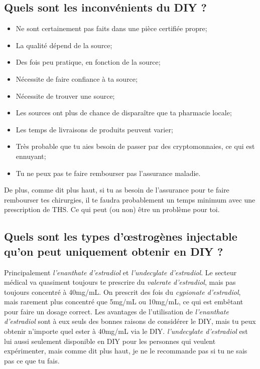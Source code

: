 \documentclass{article}
\begin{document}
\subsection{Quels sont les inconvénients du DIY ?}

\begin{itemize}
  \item Ne sont certainement pas faits dans une pièce certifiée propre;
  \item La qualité dépend de la source;
  \item Des fois peu pratique, en fonction de la source;
  \item Nécessite de faire confiance à ta source;
  \item Nécessite de trouver une source;
  \item Les sources ont plus de chance de disparaître que ta pharmacie locale;
  \item Les temps de livraisons de produits peuvent varier;
  \item Très probable que tu aies besoin de passer par des cryptomonnaies, ce qui est ennuyant;
  \item Tu ne peux pas te faire rembourser pas l'assurance maladie.
\end{itemize}
De plus, comme dit plus haut, si tu as besoin de l'assurance pour te faire rembourser tes chirurgies, il te faudra probablement un temps minimum avec une prescription de THS. Ce qui peut (ou non) être un problème pour toi.

\subsection{Quels sont les types d'œstrogènes injectable qu'on peut uniquement obtenir en DIY ?}

Principalement \textit{l'enanthate d'estradiol} et \textit{l'undecylate d'estradiol}. Le secteur médical va quasiment toujours te prescrire du \textit{valerate d'estradiol}, mais pas toujours concentré à 40mg/mL. On prescrit des fois du \textit{cypionate d'estradiol}, mais rarement plus concentré que 5mg/mL ou 10mg/mL, ce qui est embêtant pour faire un dosage correct. Les avantages de l'utilisation de \textit{l'enanthate d'estradiol} sont à eux seuls des bonnes raisons de considérer le DIY, mais tu peux obtenir n'importe quel ester à 40mg/mL via le DIY. \textit{l'undecylate d'estradiol} est lui aussi seulement disponible en DIY pour les personnes qui veulent expérimenter, mais comme dit plus haut, je ne le recommande pas si tu ne sais pas ce que tu fais.
\end{document}
